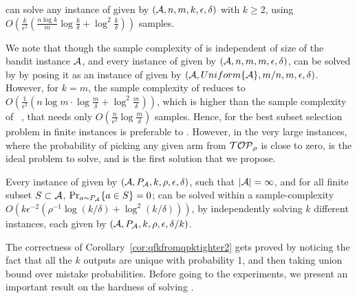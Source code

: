 \begin{corollary}
\label{cor:qfkfromqpktighter}
\KQP can solve any instance of \QFK given by $(\mathcal{A}, n, m, k, \epsilon, \delta)$ with $k \geq 2$, using $O\left(\frac{k}{\epsilon^2}\left(\frac{n\log k}{m}\log\frac{k}{\delta} + \log^2\frac{k}{\delta}\right)\right)$ samples.
\end{corollary}

We note that though the sample complexity of \KQP is independent of size of the bandit instance $\mathcal{A}$, and every
instance of \QFK given by $(\mathcal{A}, n, m, m , \epsilon, \delta)$, can be solved by \KQP by posing it as an instance of 
\QPK given by $(\mathcal{A},  Uniform\{\mathcal{A}\}, m/n, m, \epsilon, \delta)$. However, for $k=m$, the sample complexity of \KQP
reduces to $O\left(\frac{1}{\epsilon^2}\left(n\log m\cdot\log\frac{m}{\delta} + \log^2\frac{m}{\delta}\right)\right)$,
which is higher than the sample complexity of \HALVING~\cite{bib:explorem}, that needs only  $O\left(\frac{n}{\epsilon^2}\log\frac{m}{\delta}\right)$ samples.
Hence, for the best subset selection problem 
in finite instances \HALVING is preferable to \KQP.
However, in the very large instances, where the probability
of picking any given arm from ${\mathcal{TOP}_\rho}$ is close to zero,
\QPK is the ideal problem to solve, and \KQP is the first
solution that we propose.

\begin{corollary}
\label{cor:qfkfromqpktighter2}
Every instance of \QPK given by $(\mathcal{A}, P_{\mathcal{A}}, k, \rho, \epsilon, \delta)$, such that
$|\mathcal{A}| = \infty$, %
and for all finite subset $S \subset \mathcal{A}$,  $\Pr_{a\sim P_{\mathcal{A}}}\{a \in S\} = 0$;
can be solved within a sample-complexity $O\left({k}{\epsilon^{-2}}\left({\rho^{-1}}\log({k}/{\delta}) + \log^2({k}/{\delta})\right)\right)$, by independently solving $k$ different \QP instances, each given by $(\mathcal{A}, P_{\mathcal{A}}, k, \rho, \epsilon, \delta/k)$.
\end{corollary}
The correctness of Corollary~\ref{cor:qfkfromqpktighter2} gets proved by noticing the fact that all the $k$ outputs are unique with probability 1, and then taking union bound over mistake probabilities.
%
Before going to the experiments, we present an important result on the hardness of solving \QP.

